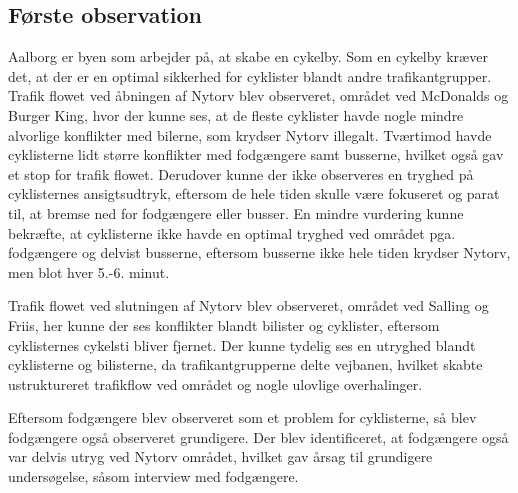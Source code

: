\subsection{Første observation}
\label{sub:foerste_obs}
Aalborg er byen som arbejder på, at skabe en cykelby.%
Som en cykelby kræver det, at der er en optimal sikkerhed for cyklister blandt andre trafikantgrupper. Trafik flowet ved åbningen af Nytorv blev observeret, området ved McDonalds og Burger King, hvor der kunne ses, at de fleste cyklister havde nogle mindre alvorlige konflikter med bilerne, som krydser Nytorv illegalt. Tværtimod havde cyklisterne lidt større konflikter med fodgængere samt busserne, hvilket også gav et stop for trafik flowet. Derudover kunne der ikke observeres en tryghed på cyklisternes ansigtsudtryk, eftersom de hele tiden skulle være fokuseret og parat til, at bremse ned for fodgængere eller busser. En mindre vurdering kunne bekræfte, at cyklisterne ikke havde en optimal tryghed ved området pga. fodgængere og delvist busserne, eftersom busserne ikke hele tiden krydser Nytorv, men blot hver 5.-6. minut.

Trafik flowet ved slutningen af Nytorv blev observeret, området ved Salling og Friis, her kunne der ses konflikter blandt bilister og cyklister, eftersom cyklisternes cykelsti bliver fjernet. Der kunne tydelig ses en utryghed blandt cyklisterne og bilisterne, da trafikantgrupperne delte vejbanen, hvilket skabte ustruktureret trafikflow ved området og nogle ulovlige overhalinger.

Eftersom fodgængere blev observeret som et problem for cyklisterne, så blev fodgængere også observeret grundigere. Der blev identificeret, at fodgængere også var delvis utryg ved Nytorv området, hvilket gav årsag til grundigere undersøgelse, såsom interview med fodgængere. 


